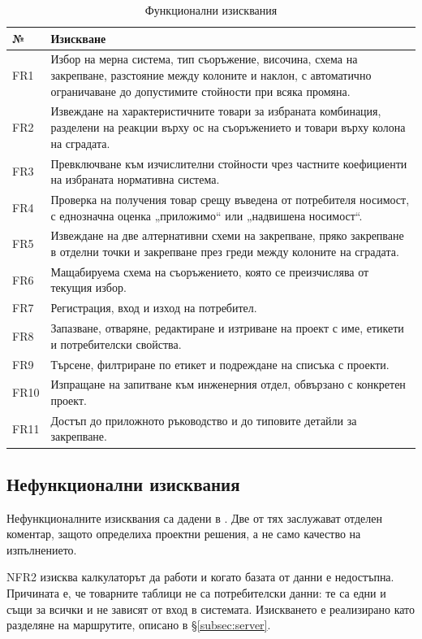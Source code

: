\begin{table}[htbp]
\centering
\caption{Функционални изисквания}
\label{tab:fr}
{\fontsize{10}{12}\selectfont
\begin{tabular}{@{}lL{11.4cm}@{}}
\toprule
\textbf{№} & \textbf{Изискване} \\
\midrule
FR1 & Избор на мерна система, тип съоръжение, височина, схема на закрепване, разстояние между колоните и наклон, с автоматично ограничаване до допустимите стойности при всяка промяна. \\
FR2 & Извеждане на характеристичните товари за избраната комбинация, разделени на реакции върху ос на съоръжението и товари върху колона на сградата. \\
FR3 & Превключване към изчислителни стойности чрез частните коефициенти на избраната нормативна система. \\
FR4 & Проверка на получения товар срещу въведена от потребителя носимост, с еднозначна оценка „приложимо“ или „надвишена носимост“. \\
FR5 & Извеждане на две алтернативни схеми на закрепване, пряко закрепване в отделни точки и закрепване през греди между колоните на сградата. \\
FR6 & Мащабируема схема на съоръжението, която се преизчислява от текущия избор. \\
FR7 & Регистрация, вход и изход на потребител. \\
FR8 & Запазване, отваряне, редактиране и изтриване на проект с име, етикети и потребителски свойства. \\
FR9 & Търсене, филтриране по етикет и подреждане на списъка с проекти. \\
FR10 & Изпращане на запитване към инженерния отдел, обвързано с конкретен проект. \\
FR11 & Достъп до приложното ръководство и до типовите детайли за закрепване. \\
\bottomrule
\end{tabular}}
\end{table}

\subsection{Нефункционални изисквания}
\label{subsec:nfr}

Нефункционалните изисквания са дадени в . Две от тях заслужават
отделен коментар, защото определиха проектни решения, а не само качество на
изпълнението.

NFR2 изисква калкулаторът да работи и когато базата от данни е недостъпна. Причината
е, че товарните таблици не са потребителски данни: те са едни и същи за всички и не
зависят от вход в системата. Изискването е реализирано като разделяне на маршрутите,
описано в §\ref{subsec:server}.

